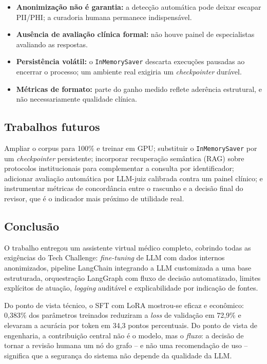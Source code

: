 \documentclass[12pt,a4paper]{article}
\begin{document}
\begin{itemize}[leftmargin=*]
  \item \textbf{Anonimização não é garantia:} a detecção automática pode deixar
        escapar PII/PHI; a curadoria humana permanece indispensável.
  \item \textbf{Ausência de avaliação clínica formal:} não houve painel de
        especialistas avaliando as respostas.
  \item \textbf{Persistência volátil:} o \texttt{InMemorySaver} descarta
        execuções pausadas ao encerrar o processo; um ambiente real exigiria um
        \emph{checkpointer} durável.
  \item \textbf{Métricas de formato:} parte do ganho medido reflete aderência
        estrutural, e não necessariamente qualidade clínica.
\end{itemize}

\subsection{Trabalhos futuros}

Ampliar o corpus para 100\% e treinar em GPU; substituir o \texttt{InMemorySaver}
por um \emph{checkpointer} persistente; incorporar recuperação semântica (RAG)
sobre protocolos institucionais para complementar a consulta por identificador;
adicionar avaliação automática por LLM-juiz calibrada contra um painel clínico; e
instrumentar métricas de concordância entre o rascunho e a decisão final do
revisor, que é o indicador mais próximo de utilidade real.

\subsection{Conclusão}

O trabalho entregou um assistente virtual médico completo, cobrindo todas as
exigências do Tech Challenge: \emph{fine-tuning} de LLM com dados internos
anonimizados, pipeline LangChain integrando a LLM customizada a uma base
estruturada, orquestração LangGraph com fluxo de decisão automatizado,
limites explícitos de atuação, \emph{logging} auditável e explicabilidade por
indicação de fontes.

Do ponto de vista técnico, o SFT com LoRA mostrou-se eficaz e econômico: 0,383\%
dos parâmetros treinados reduziram a \emph{loss} de validação em 72,9\% e
elevaram a acurácia por token em 34,3 pontos percentuais. Do ponto de vista de
engenharia, a contribuição central não é o modelo, mas o \emph{fluxo}: a decisão
de tornar a revisão humana um nó do grafo -- e não uma recomendação de uso --
significa que a segurança do sistema não depende da qualidade da LLM.
\end{document}
